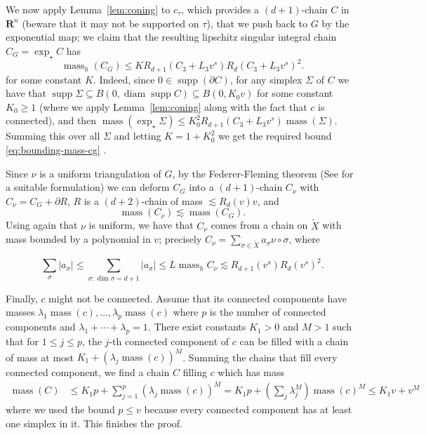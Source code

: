 \documentclass[12pt]{amsart}
\theoremstyle{definition}
\begin{document}
We now apply Lemma~\ref{lem:coning} to $c_\tau$, 
which provides a $(d+1)$-chain $C$ in $\mathbf R^n$ (beware that it may not be supported on $\tau$), that we push back to $G$ by the exponential map; we claim that the resulting lipschitz singular integral chain $C_G = \exp_{\star} C$ has
\begin{equation}
\label{eq:bounding-mass-cg}
     \operatorname{mass}_h(C_G) \leq KR_{d+1}(C_3+L_3v^s)R_d(C_3+L_3v^s)^2.
\end{equation}
for some constant $K$.
Indeed, since $0 \in \operatorname{supp}(\partial C)$, for any simplex $\Sigma$ of $C$ we have that $\operatorname{supp} \Sigma \subseteq B(0, \operatorname{diam} \operatorname{supp} C) \subseteq B(0,K_0v)$ for some constant $K_0 \geqslant 1$ (where we apply Lemma~\ref{lem:coning} along with the fact that $c$ is connected), and then
$
\operatorname{mass}(\exp_\star \Sigma) \leqslant K_0^2 R_{d+1}(C_3+L_3v^s) \operatorname{mass}(\Sigma)$.
Summing this over all $\Sigma$ and letting $K = 1+K_0^2$ we get the required bound \eqref{eq:bounding-mass-cg} .

Since $\nu$ is a uniform triangulation of $G$, by the Federer-Fleming theorem (See \cite[Theorem 2]{YoungFillNil} for a suitable formulation) we can deform $C_G$ into a $(d+1)$-chain $C_\nu$ with $C_\nu = C_G + \partial R$, $R$ is a $(d+2)$-chain of mass $\lesssim R_d(v) v$, and 
\begin{equation*}
    \operatorname{mass}(C_\nu) \lesssim \operatorname{mass}(C_G).
\end{equation*}
Using again that $\nu$ is uniform, we have that $C_\nu$ comes from a chain on $\widetilde X$ with mass bounded by a polynomial in $v$; precisely 
$C_\nu = \sum_{\sigma \in \widetilde X} a_\sigma \nu \circ \sigma$, where 

$$\sum_\sigma \vert a_\sigma \vert \leqslant \sum_{\sigma : \dim \sigma = d+1} \vert a_ \sigma \vert \leqslant L \operatorname{mass}_h C_\nu \lesssim R_{d+1} (v^s) R_d(v^s)^2.$$

Finally, $c$ might not be connected. 
Assume that its connected components have masses $\lambda_1 \operatorname{mass}(c), \ldots, \lambda_p \operatorname{mass}(c)$ where $p$ is the number of connected components and $\lambda_1+\cdots + \lambda_p = 1$.
There exist constants $K_1 >0$ and $M> 1$ such that for $1\leqslant j \leqslant p$, the $j$-th connected component of $c$ can be filled with a chain of mass at most $K_1 + (\lambda_j \operatorname{mass}(c))^M$.
Summing the chains that fill every connected component, we find a chain $C$ filling $c$ which has mass
\begin{align*}
    \operatorname{mass}(C) & \leq K_1p + \sum_{j=1}^p (\lambda_j \operatorname{mass}(c))^M  = K_1p + \left( \sum_j \lambda_j^M \right) \operatorname{mass}(c)^M\leq K_1v + v^M
\end{align*}
where we used the bound $p \leqslant v$ because every connected component has at least one simplex in it. This finishes the proof.
\end{document}
